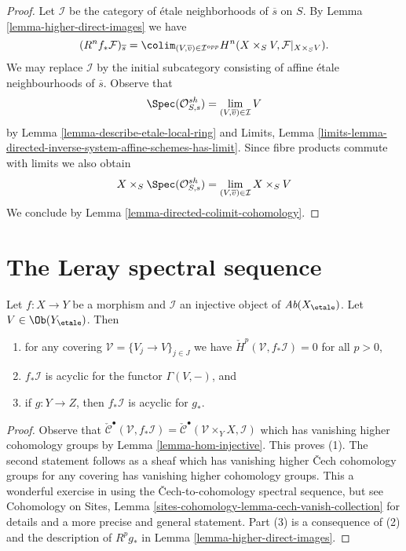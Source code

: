 \begin{proof}
Let $\mathcal{I}$ be the category of \'etale neighborhoods of $\overline{s}$
on $S$. By Lemma \ref{lemma-higher-direct-images}
we have
$$
(R^nf_*\mathcal{F})_{\overline{s}} =
\colim_{(V, \overline{v}) \in \mathcal{I}^{opp}}
H^n(X \times_S V, \mathcal{F}|_{X \times_S V}).
$$
We may replace $\mathcal{I}$ by the initial subcategory consisting
of affine \'etale neighbourhoods of $\overline{s}$. Observe that
$$
\Spec(\mathcal{O}_{S, s}^{sh}) =
\lim_{(V, \overline{v}) \in \mathcal{I}} V
$$
by Lemma \ref{lemma-describe-etale-local-ring} and
Limits, Lemma
\ref{limits-lemma-directed-inverse-system-affine-schemes-has-limit}.
Since fibre products commute with limits we also obtain
$$
X \times_S \Spec(\mathcal{O}_{S, s}^{sh}) =
\lim_{(V, \overline{v}) \in \mathcal{I}} X \times_S V
$$
We conclude by Lemma \ref{lemma-directed-colimit-cohomology}.
\end{proof}





\section{The Leray spectral sequence}
\label{section-leray}

\begin{lemma}
\label{lemma-prepare-leray}
Let $f: X \to Y$ be a morphism and $\mathcal{I}$ an injective object of
$\textit{Ab}(X_\etale)$. Let $V \in \Ob(Y_\etale)$. Then
\begin{enumerate}
\item for any covering $\mathcal{V} = \{V_j\to V\}_{j \in J}$ we have
$\check H^p(\mathcal{V}, f_*\mathcal{I}) = 0$ for all $p > 0$,
\item $f_*\mathcal{I}$ is acyclic for the functor $\Gamma(V, -)$, and
\item if $g : Y \to Z$, then $f_*\mathcal{I}$ is acyclic for $g_*$.
\end{enumerate}
\end{lemma}

\begin{proof}
Observe that $\check{\mathcal{C}}^\bullet(\mathcal{V}, f_*\mathcal{I}) =
\check{\mathcal{C}}^\bullet(\mathcal{V} \times_Y X, \mathcal{I})$
which has vanishing higher cohomology groups by Lemma \ref{lemma-hom-injective}.
This proves (1). The second statement follows as a sheaf which has
vanishing higher {\v C}ech cohomology groups for any covering has vanishing
higher cohomology groups. This a wonderful exercise in using the
{\v C}ech-to-cohomology spectral sequence, but see
Cohomology on Sites, Lemma \ref{sites-cohomology-lemma-cech-vanish-collection}
for details and a more precise and general statement.
Part (3) is a consequence of (2) and the description of
$R^pg_*$ in Lemma \ref{lemma-higher-direct-images}.
\end{proof}

